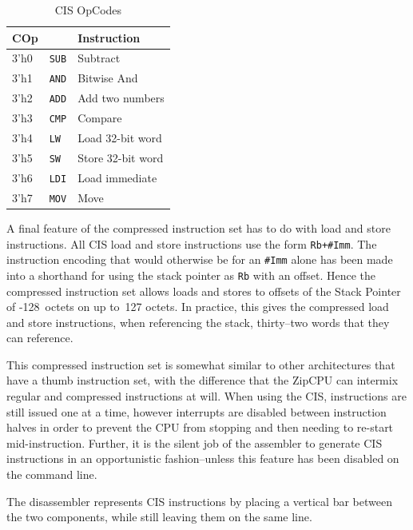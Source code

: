 \documentclass{gqtekspec}
\begin{document}
\begin{table}\begin{center}
\begin{tabular}{|l|l|l|} \hline \rowcolor[gray]{0.85}
COp & & Instruction \\\hline\hline
3'h0 & {\tt SUB} & Subtract   \\\hline
3'h1 & {\tt AND} & Bitwise And   \\\hline
3'h2 & {\tt ADD} & Add two numbers   \\\hline
3'h3 & {\tt CMP}  & Compare \\\hline
3'h4 & {\tt LW} & Load 32-bit word\\\hline
3'h5 & {\tt SW} & Store 32-bit word\\\hline
3'h6 & {\tt LDI} & Load immediate\\\hline
3'h7 & {\tt MOV} & Move\\\hline
\end{tabular}
\caption{CIS OpCodes}\label{tbl:iset-cisops}
\end{center}\end{table}

A final feature of the compressed instruction set has to do with load and
store instructions.  All CIS load and store instructions use the form
{\tt Rb+\#Imm}.  The instruction encoding that would otherwise be for
an {\tt \#Imm} alone has been made into a shorthand for using the stack pointer
as {\tt Rb} with an offset.  Hence the compressed instruction set allows loads
and stores to offsets of the Stack Pointer of -128~octets on up to~127 octets.
In practice, this gives the compressed load and store instructions, when
referencing the stack, thirty--two words that they can reference.

This compressed instruction set is somewhat similar to other architectures that
have a thumb instruction set, with the difference that the ZipCPU can intermix
regular and compressed instructions at will.  When using the CIS, instructions
are still issued one at a time, however interrupts are disabled between
instruction halves in order to prevent the CPU from stopping and then needing
to re-start mid-instruction.  Further, it is the silent job of the assembler
to generate CIS instructions in an opportunistic fashion--unless this feature
has been disabled on the command line.

The disassembler represents CIS instructions by placing a vertical bar
between the two components, while still leaving them on the same line.
\end{document}
